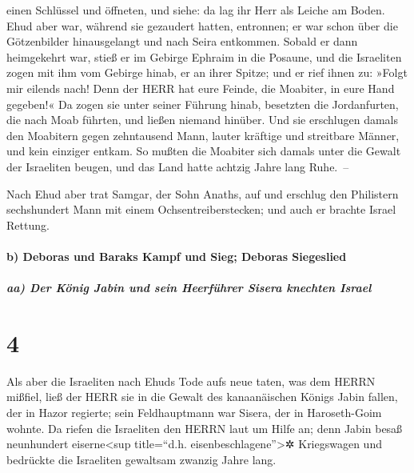 einen Schlüssel und öffneten, und siehe: da lag ihr Herr als Leiche am
Boden. Ehud aber war, während sie gezaudert hatten,
entronnen; er war schon über die Götzenbilder hinausgelangt und nach
Seira entkommen. Sobald er dann heimgekehrt war, stieß er
im Gebirge Ephraim in die Posaune, und die Israeliten zogen mit ihm vom
Gebirge hinab, er an ihrer Spitze; und er rief ihnen zu:
»Folgt mir eilends nach! Denn der HERR hat eure Feinde, die Moabiter, in
eure Hand gegeben!« Da zogen sie unter seiner Führung hinab, besetzten
die Jordanfurten, die nach Moab führten, und ließen niemand hinüber.
Und sie erschlugen damals den Moabitern gegen zehntausend
Mann, lauter kräftige und streitbare Männer, und kein einziger entkam.
So mußten die Moabiter sich damals unter die Gewalt der
Israeliten beugen, und das Land hatte achtzig Jahre lang Ruhe.~--

Nach Ehud aber trat Samgar, der Sohn Anaths, auf und
erschlug den Philistern sechshundert Mann mit einem
Ochsentreiberstecken; und auch er brachte Israel Rettung.

\hypertarget{b-deboras-und-baraks-kampf-und-sieg-deboras-siegeslied}{%
\paragraph{b) Deboras und Baraks Kampf und Sieg; Deboras
Siegeslied}\label{b-deboras-und-baraks-kampf-und-sieg-deboras-siegeslied}}

\hypertarget{aa-der-kuxf6nig-jabin-und-sein-heerfuxfchrer-sisera-knechten-israel}{%
\subparagraph{aa) Der König Jabin und sein Heerführer Sisera knechten
Israel}\label{aa-der-kuxf6nig-jabin-und-sein-heerfuxfchrer-sisera-knechten-israel}}

\hypertarget{section-3}{%
\section{4}\label{section-3}}

Als aber die Israeliten nach Ehuds Tode aufs neue taten,
was dem HERRN mißfiel, ließ der HERR sie in die Gewalt des
kanaanäischen Königs Jabin fallen, der in Hazor regierte; sein
Feldhauptmann war Sisera, der in Haroseth-Goim wohnte. Da
riefen die Israeliten den HERRN laut um Hilfe an; denn Jabin besaß
neunhundert eiserne\textless sup title=``d.h.
eisenbeschlagene''\textgreater✲ Kriegswagen und bedrückte die Israeliten
gewaltsam zwanzig Jahre lang.

